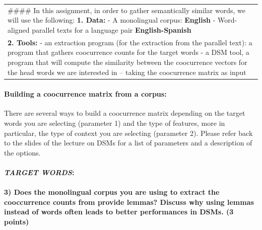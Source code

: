 \documentclass[11pt]{article}
\begin{document}
    \begin{longtable}[]{@{}l@{}}
\toprule
\endhead
\begin{minipage}[t]{0.09\columnwidth}\raggedright
\#\#\#\# In this assignment, in order to gather semantically similar
words, we will use the following: \textbf{1. Data:} - A monolingual
corpus: \textbf{English} - Word-aligned parallel texts for a language
pair \textbf{English-Spanish}\strut
\end{minipage}\tabularnewline
\begin{minipage}[t]{0.09\columnwidth}\raggedright
\textbf{2. Tools:} - an extraction program (for the extraction from the
parallel text): a program that gathers coocurrence counts for the target
words - a DSM tool, a program that will compute the similarity between
the coocurrence vectors for the head words we are interested in --
taking the coocurrence matrix as input\strut
\end{minipage}\tabularnewline
\bottomrule
\end{longtable}

    \hypertarget{building-a-coocurrence-matrix-from-a-corpus}{%
\paragraph{Building a coocurrence matrix from a
corpus:}\label{building-a-coocurrence-matrix-from-a-corpus}}

There are several ways to build a coocurrence matrix depending on the
target words you are selecting (parameter 1) and the type of features,
more in particular, the type of context you are selecting (parameter 2).
Please refer back to the slides of the lecture on DSMs for a list of
parameters and a description of the options.

\hypertarget{target-words}{%
\paragraph{\texorpdfstring{\emph{TARGET
WORDS}:}{TARGET WORDS:}}\label{target-words}}

    \hypertarget{does-the-monolingual-corpus-you-are-using-to-extract-the-cooccurrence-counts-from-provide-lemmas-discuss-why-using-lemmas-instead-of-words-often-leads-to-better-performances-in-dsms.-3-points}{%
\paragraph{3) Does the monolingual corpus you are using to extract the
cooccurrence counts from provide lemmas? Discuss why using lemmas
instead of words often leads to better performances in DSMs. (3
points)}\label{does-the-monolingual-corpus-you-are-using-to-extract-the-cooccurrence-counts-from-provide-lemmas-discuss-why-using-lemmas-instead-of-words-often-leads-to-better-performances-in-dsms.-3-points}}
\end{document}
